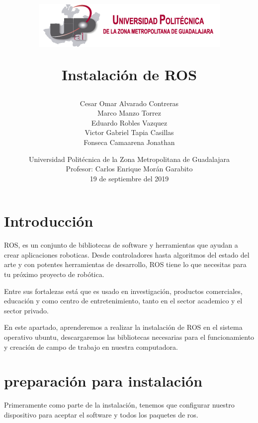 \documentclass[12pt,a4paper]{report}
\begin{document}
\author{Cesar Omar Alvarado Contreras\\
Marco Manzo Torrez\\
Eduardo Robles Vazquez\\
Victor Gabriel Tapia Casillas\\
Fonseca Camaarena Jonathan}

\title{\begin{center}
\includegraphics[scale=1.5]{Escudo.png} 
\end{center}Instalación de ROS}

\date{
Universidad Politécnica de la Zona Metropolitana de Guadalajara\\
Profesor: Carlos Enrique Morán Garabito\\
19 de septiembre del 2019}

\maketitle
\tableofcontents
\section{Introducción}
ROS, es un conjunto de bibliotecas de software y herramientas que ayudan a crear aplicaciones roboticas. Desde controladores hasta algoritmos del estado del arte y con potentes herramientas de desarrollo, ROS tiene lo que necesitas para tu próximo proyecto de robótica. 

\noindent Entre sus fortalezas está que es usado en investigación, productos comerciales, educación y como centro de entretenimiento, tanto en el sector academico y el sector privado.

\noindent En este apartado, aprenderemos a realizar la instalación de ROS en el sistema operativo ubuntu, descargaremos las bibliotecas necesarias para el funcionamiento y creación de campo de trabajo en nuestra computadora.
\section{preparación para instalación}
Primeramente como parte de la instalación, tenemos que configurar nuestro dispositivo para aceptar el software y todos los paquetes de ros.
\end{document}
